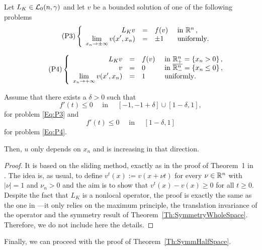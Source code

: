 \begin{proposition}
\label{Prop:HalfSpaceLimUnif}
Let $L_K \in \mathcal{L}_0(n,\gamma)$ and let $v$ be a bounded solution of one of the following problems
\begin{equation}
\leqnomode
\tag{P3}
\label{Eq:P3}
\beqc{\PDEsystem}
L_K  v &=& f(v)  &\textrm{ in }\R^n\,,\\
\ds \lim_{x_n \to \pm \infty} v(x',x_n) &=& \pm 1 \,\,\, &\textrm{ uniformly}.
\eeqc
\end{equation}

\begin{equation}
\leqnomode
\tag{P4}
\label{Eq:P4}
\beqc{\PDEsystem}
L_K  v &=& f(v)  &\textrm{ in }\R^n_+ = \{ x_n>0\} \,,\\
v &=& 0  &\textrm{ in }\overline{\R^n_-} = \{ x_n\leq 0\}\,,\\
\ds \lim_{x_n \to + \infty} v(x',x_n) &=& 1 \,\,\, &\textrm{ uniformly}.
\eeqc
\end{equation}

\reqnomode

Assume that there exists a $\delta > 0$ such that
$$ f'(t) \leq 0 \quad \text{ in } \quad [-1,-1+\delta]\cup[1-\delta,1], $$
for problem \eqref{Eq:P3} and
$$ f'(t) \leq 0 \quad \text{ in } \quad [1-\delta,1] $$
for problem \eqref{Eq:P4}.

Then, $u$ only depends on $x_n$ and is increasing in that direction.
\end{proposition}

\begin{proof}
It is based on the sliding method, exactly as in the proof of Theorem~1 in \cite{BerestyckiHamelMonneau}. The idea is, as usual,   to define $ v^t(x) := v(x+\nu t) $ for every $\nu\in\mathbb{R}^n$ with $|\nu|=1$ and $\nu_n>0$ and the aim is to show that $v^t(x)-v(x)\geq 0$ for all $t\geq 0$. Despite the fact that $L_K$ is a nonlocal operator, the proof is exactly the same as the one in \cite{BerestyckiHamelMonneau} ---it only relies on the maximum principle, the translation invariance of the operator and the symmetry result of Theorem~\ref{Th:SymmetryWholeSpace}. Therefore, we do not include here the details.
\end{proof}






Finally, we can proceed with the proof of Theorem~\ref{Th:SymmHalfSpace}.

